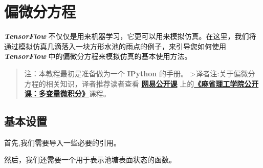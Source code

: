 

\section{偏微分方程 }\label{ux504fux5faeux5206ux65b9ux7a0b}

\textbf{\emph{TensorFlow}}
不仅仅是用来机器学习，它更可以用来模拟仿真。在这里，我们将通过模拟仿真几滴落入一块方形水池的雨点的例子，来引导您如何使用
\textbf{\emph{TensorFlow}} 中的偏微分方程来模拟仿真的基本使用方法。

\begin{quote}
注：本教程最初是准备做为一个 \textbf{IPython} 的手册。
\textgreater{}译者注:关于偏微分方程的相关知识，译者推荐读者查看
\href{http://open.163.com/}{\textbf{网易公开课}}
上的\href{http://open.163.com/special/opencourse/multivariable.html}{\textbf{《麻省理工学院公开课：多变量微积分》}}课程。
\end{quote}

\subsection{基本设置 }\label{ux57faux672cux8bbeux7f6e}

首先,我们需要导入一些必要的引用。

\begin{Shaded}
\begin{Highlighting}[]
  
  

 
  
  
\end{Highlighting}
\end{Shaded}

然后，我们还需要一个用于表示池塘表面状态的函数。

\begin{Shaded}
\begin{Highlighting}[]
 \OperatorTok{=}\OperatorTok{=}\NormalTok{[}\NormalTok{,}\NormalTok{]):}
  \OperatorTok{=} \OperatorTok{-} \NormalTok{rng[}\NormalTok{])}\OperatorTok{/}\NormalTok{(rng[}\NormalTok{] }\OperatorTok{-} \NormalTok{rng[}\NormalTok{])}\OperatorTok{*}
  \OperatorTok{=} \NormalTok{, }\NormalTok{))}
  \OperatorTok{=} 
  \OperatorTok{=}
\end{Highlighting}
\end{Shaded}

